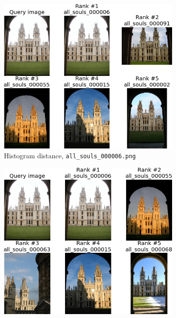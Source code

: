 \documentclass[a4paper,10pt]{article}
\begin{document}
\begin{figure}
  \begin{subfigure}{0.47\textwidth}
    \centering
    \includegraphics[width=\textwidth]{ranking_h_6.png}
    \caption{Histogram distance, \texttt{all\_souls\_000006.png}}
  \end{subfigure}
  \hspace*{\fill}
  \begin{subfigure}{0.47\textwidth}
    \centering
    \includegraphics[width=\textwidth]{ranking_l_6.png}

\end{subfigure}
\end{figure}
\end{document}
